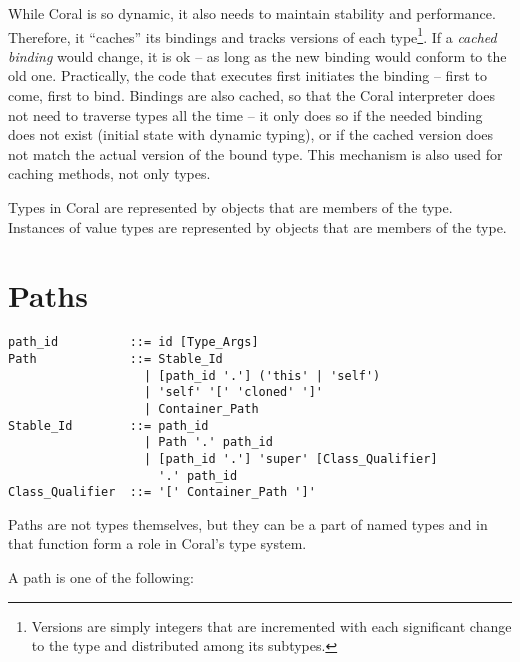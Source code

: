 While Coral is so dynamic, it also needs to maintain stability and performance. Therefore, it ``caches'' its bindings and tracks versions of each type\footnote{Versions are simply integers that are incremented with each significant change to the type and distributed among its subtypes.}. If a {\em cached binding} would change, it is ok -- as long as the new binding would conform to the old one. Practically, the code that executes first initiates the binding -- first to come, first to bind. Bindings are also cached, so that the Coral interpreter does not need to traverse types all the time -- it only does so if the needed binding does not exist (initial state with dynamic typing), or if the cached version does not match the actual version of the bound type. This mechanism is also used for caching methods, not only types.

Types in Coral are represented by objects that are members of the  type. Instances of value types are represented by objects that are members of the  type. 






\section{Paths}
\label{sec:type-paths}

\syntax\begin{lstlisting}
path_id          ::= id [Type_Args]
Path             ::= Stable_Id
                   | [path_id '.'] ('this' | 'self')
                   | 'self' '[' 'cloned' ']'
                   | Container_Path
Stable_Id        ::= path_id
                   | Path '.' path_id
                   | [path_id '.'] 'super' [Class_Qualifier] 
                     '.' path_id
Class_Qualifier  ::= '[' Container_Path ']'
\end{lstlisting}

Paths are not types themselves, but they can be a part of named types and in that function form a role in Coral's type system. 

A path is one of the following:


